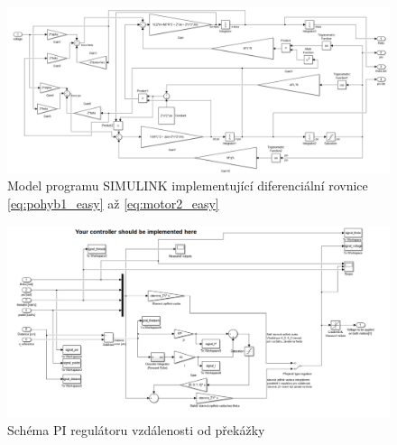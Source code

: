 \documentclass[conference]{IEEEtran}
\begin{document}
\begin{figure}[htbp]
    \centerline{\includegraphics[width=\linewidth]{nelinearni_system_simulink.png}}
    \caption{Model programu SIMULINK implementující diferenciální rovnice \eqref{eq:pohyb1_easy} až \eqref{eq:motor2_easy}}
    \label{fig:simulink_nelin_model}        
\end{figure}

\begin{figure}[htbp]
    \centerline{\includegraphics[width=\linewidth]{rizeni_simulink.png}}
    \caption{Schéma PI regulátoru vzdálenosti od překážky}
    \label{fig:simulink_rizeni}        
\end{figure}
\end{document}
